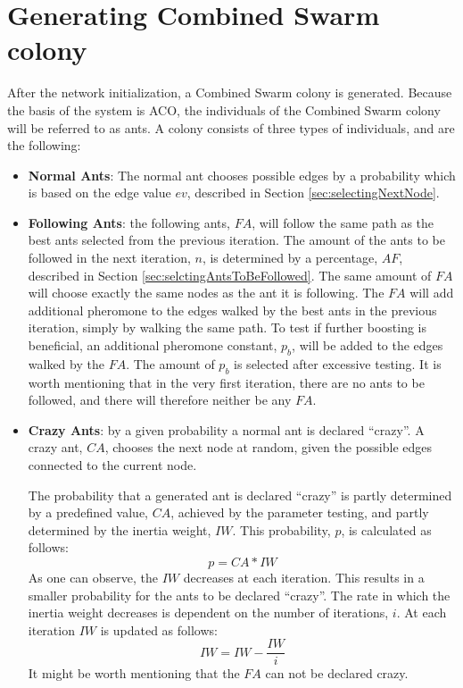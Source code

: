\section{Generating Combined Swarm colony}
\label{sec:algoGeneratingSuperSwarm}
After the network initialization, a Combined Swarm colony is generated. Because the basis of the system is ACO, the individuals of the Combined Swarm colony will be referred to as ants. A colony consists of three types of individuals, and are the following:

\begin{itemize}
\item \textbf{Normal Ants}: The normal ant chooses possible edges by a probability which is based on the edge value $ev$, described in Section \vref{sec:selectingNextNode}.

\item \textbf{Following Ants}: the following ants, $FA$, will follow the same path as the best ants selected from the previous iteration. The amount of the ants to be followed in the next iteration, $n$, is determined by a percentage, $AF$, described in Section \vref{sec:selctingAntsToBeFollowed}. The same amount of $FA$ will choose exactly the same nodes as the ant it is following.
\newline
\newline
The $FA$ will add additional pheromone to the edges walked by the best ants in the previous iteration, simply by walking the same path. To test if further boosting is beneficial, an additional pheromone constant, $p_b$, will be added to the edges walked by the $FA$. The amount of $p_b$ is selected after excessive testing. It is worth mentioning that in the very first iteration, there are no ants to be followed, and there will therefore neither be any $FA$.  

\item \textbf{Crazy Ants}: by a given probability a normal ant is declared ``crazy''. A crazy ant, $CA$, chooses the next node at random, given the possible edges connected to the current node. 

The probability that a generated ant is declared ``crazy'' is partly determined by a predefined value, $CA$, achieved by the parameter testing, and partly determined by the inertia weight, $IW$. This probability, $p$, is calculated as follows:
$$p = CA*IW$$
As one can observe, the $IW$ decreases at each iteration. This results in a smaller probability for the ants to be declared ``crazy''. The rate in which the inertia weight decreases is dependent on the number of iterations, $i$. At each iteration $IW$ is updated as follows:
$$IW = IW - \frac{IW}{i}$$
It might be worth mentioning that the $FA$ can not be declared crazy. 

\end{itemize}
